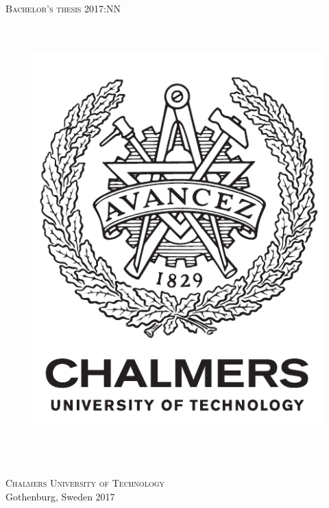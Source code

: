 \newpage
\thispagestyle{empty}
\begin{center}
	\textsc{\large Bachelor's thesis 2017:NN}\\[4cm]		%
	\textbf{\Large \varHeadline} \\[1cm]
	{\large \varSubtitle}\\[1cm]
	{\large \varNames}
	
	\vfill	
	\begin{figure}[H]
	\centering
	\includegraphics[width=0.2\pdfpagewidth]{figure/auxiliary/logo_eng.pdf} \\	
	\end{figure}	\vspace{5mm}	
	
	\varDepartment \\
	\emph{\varDivision}\\
	\varResearchGroupName\\
	\textsc{Chalmers University of Technology} \\
	Gothenburg, Sweden 2017 \\
\end{center}


